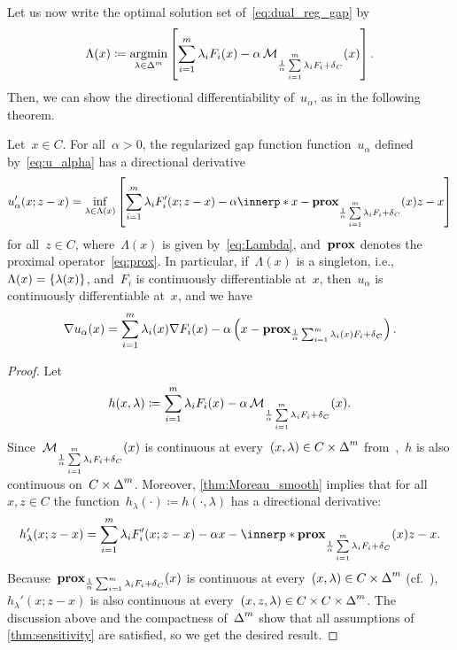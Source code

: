 \documentclass[../../main]{subfiles}
\begin{document}
Let us now write the optimal solution set of~\cref{eq:dual_reg_gap} by
\begin{equation} \label{eq:Lambda}
    \Lambda(x) \coloneqq \argmin_{\lambda \in \simplex^m} \left[ \sum_{i = 1}^{m} \lambda_i F_i(x) - \alpha \envelope_{\frac{1}{\alpha} \sum\limits_{i = 1}^{m} \lambda_i F_i + \indicator_C} (x) \right]
.\end{equation} 
Then, we can show the directional differentiability of~$u_\alpha$, as in the following theorem.
\begin{theorem} \label{thm:smooth_reg_gap}
    Let~$x \in C$.
    For all~$\alpha > 0$, the regularized gap function function~$u_\alpha$ defined by~\cref{eq:u_alpha} has a directional derivative
    \[
        u_\alpha'(x; z - x) = \inf_{\lambda \in \Lambda(x)} \left[ \sum_{i = 1}^{m} \lambda_i F_i'(x; z - x) - \alpha \innerp*{x - \prox_{\frac{1}{\alpha} \sum\limits_{i = 1}^{m} \lambda_i F_i + \indicator_C}(x)}{z - x} \right] 
    \] 
    for all~$z \in C$, where~$\Lambda(x)$ is given by~\cref{eq:Lambda}, and~$\prox$ denotes the proximal operator~\cref{eq:prox}.
    In particular, if~$\Lambda(x)$ is a singleton, i.e.,~$\Lambda(x) = \set*{\lambda(x)}$, and~$F_i$ is continuously differentiable at~$x$, then~$u_\alpha$ is continuously differentiable at~$x$, and we have
    \[
        \nabla u_\alpha(x) = \sum_{i = 1}^{m} \lambda_i(x) \nabla F_i(x) - \alpha \left( x - \prox_{\frac{1}{\alpha} \sum_{i = 1}^{m} \lambda_i(x) F_i + \indicator_C} \right) 
    .\] 
\end{theorem}
\begin{proof}
    Let
    \[
        h(x, \lambda) \coloneqq \sum_{i = 1}^{m} \lambda_i F_i(x) - \alpha \envelope_{\frac{1}{\alpha} \sum\limits_{i = 1}^{m} \lambda_i F_i + \indicator_C} (x)
    .\] 
    Since~$\envelope_{\frac{1}{\alpha} \sum\limits_{i = 1}^{m} \lambda_i F_i + \indicator_C} (x)$ is continuous at every~$(x, \lambda) \in C \times \simplex^m$ from~\cite[Theorem~7.37]{Rockafellar1998},~$h$ is also continuous on~$C \times \simplex^m$.
    Moreover, \cref{thm:Moreau_smooth} implies that for all~$x, z \in C$ the function~$h_\lambda(\cdot) \coloneqq h(\cdot, \lambda)$ has a directional derivative:
    \[
        h_\lambda'(x; z - x) = \sum_{i = 1}^{m} \lambda_i F_i'(x; z - x) - \alpha x - \innerp*{\prox_{\frac{1}{\alpha} \sum\limits_{i = 1}^{m} \lambda_i F_i + \indicator_C}(x)}{z - x}
    .\] 
    Because~$\prox_{\frac{1}{\alpha} \sum_{i = 1}^{m} \lambda_i F_i + \indicator_C} (x)$ is continuous at every~$(x, \lambda) \in C \times \simplex^m$ (cf.~\cite[Exercise~7.38]{Rockafellar1998}),~$h_\lambda'(x; z - x)$ is also continuous at every~$(x, z, \lambda) \in C \times C \times \simplex^m$.
    The discussion above and the compactness of~$\simplex^m$ show that all assumptions of \cref{thm:sensitivity} are satisfied, so we get the desired result.
\end{proof}
\end{document}
